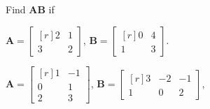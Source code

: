 
%
%
%

	Find $\mathbf{AB}$ if
	\begin{subproblem}
		\item $\mathbf{A} = \begin{bmatrix*}[r] 2 & 1 \\ 3 & 2 \end{bmatrix*}$,
			  $\mathbf{B} = \begin{bmatrix*}[r] 0 & 4 \\ 1 & 3 \end{bmatrix*}$.
		\item $\mathbf{A} = \begin{bmatrix*}[r] 1 &-1 \\ 0 & 1 \\ 2 & 3 \end{bmatrix*}$,
			  $\mathbf{B} = \begin{bmatrix*}[r] 3 &-2 &-1 \\ 1 & 0 & 2 \end{bmatrix*}$,
	\end{subproblem}

\solution
	\begin{subproblem}
		\item 
		\item 
	\end{subproblem}
